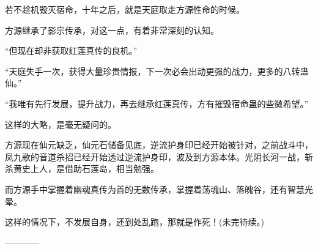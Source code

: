 \begin{this_body}
若不趁机毁灭宿命，十年之后，就是天庭取走方源性命的时候。

方源继承了影宗传承，对这一点，有着非常深刻的认知。

“但现在却非获取红莲真传的良机。”

“天庭失手一次，获得大量珍贵情报，下一次必会出动更强的战力，更多的八转蛊仙。”

“我唯有先行发展，提升战力，再去继承红莲真传，方有摧毁宿命蛊的些微希望。”

这样的大略，是毫无疑问的。

方源现在仙元缺乏，仙元石储备见底，逆流护身印已经开始被针对，之前战斗中，凤九歌的音道杀招已经开始透过逆流护身印，波及到方源本体。光阴长河一战，斩杀黄史上人，是借助石莲岛，相当勉强。

而方源手中掌握着幽魂真传为首的无数传承，掌握着荡魂山、落魄谷，还有智慧光晕。

这样的情况下，不发展自身，还到处乱跑，那就是作死！(未完待续。)

------------

\end{this_body}

